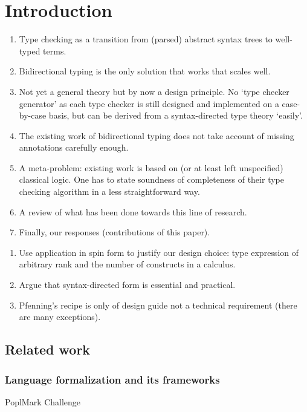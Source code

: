 
\section{Introduction}\label{sec:intro}

\begin{enumerate}
  \item Type checking as a transition from (parsed) abstract syntax trees to well-typed terms.
  \item Bidirectional typing is the only solution that works that scales well.
  \item Not yet a general theory but by now a design principle.
    No `type checker generator' as each type checker is still designed and implemented on a case-by-case basis, but can be derived from a syntax-directed type theory `easily'.
  \item The existing work of bidirectional typing does not take account of missing annotations carefully enough. 
  \item A meta-problem: existing work is based on (or at least left unspecified) classical logic.
    One has to state soundness of completeness of their type checking algorithm in a less straightforward way.
  \item A review of what has been done towards this line of research.
  \item Finally, our responses (contributions of this paper).
\end{enumerate}


\begin{enumerate}
  \item Use application in spin form to justify our design choice: type expression of arbitrary rank and the number of constructs in a calculus.
  \item Argue that syntax-directed form is essential and practical.
  \item Pfenning's recipe is only of design guide not a technical requirement (there are many exceptions).
\end{enumerate}

\subsection{Related work}

\citep{Xie2018}
\subsubsection{Language formalization and its frameworks}
\cite{Wadler2022}
PoplMark Challenge~\citep{Aydemir2005}

